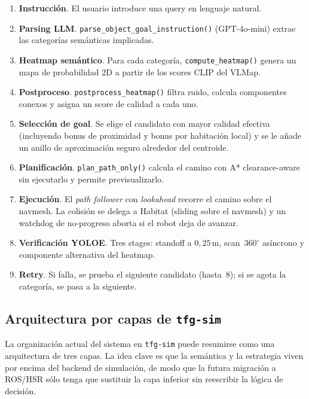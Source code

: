 \documentclass[11pt,a4paper]{article}
\begin{document}
\begin{enumerate}
  \item \textbf{Instrucción}. El usuario introduce una query en lenguaje
        natural.
  \item \textbf{Parsing LLM}. \texttt{parse\_object\_goal\_instruction()}
        (GPT-4o-mini) extrae las categorías semánticas implicadas.
  \item \textbf{Heatmap semántico}. Para cada categoría,
        \texttt{compute\_heatmap()} genera un mapa de probabilidad 2D a
        partir de los scores CLIP del VLMap.
  \item \textbf{Postproceso}. \texttt{postprocess\_heatmap()} filtra ruido,
        calcula componentes conexos y asigna un score de calidad a cada uno.
  \item \textbf{Selección de goal}. Se elige el candidato con mayor calidad
        efectiva (incluyendo bonus de proximidad y bonus por habitación
        local) y se le añade un anillo de aproximación seguro alrededor del
        centroide.
  \item \textbf{Planificación}. \texttt{plan\_path\_only()} calcula el camino
        con A* clearance-aware sin ejecutarlo y permite previsualizarlo.
  \item \textbf{Ejecución}. El \textit{path follower} con \textit{lookahead}
        recorre el camino sobre el navmesh. La colisión se delega a Habitat
        (sliding sobre el navmesh) y un watchdog de no-progreso aborta si el
        robot deja de avanzar.
  \item \textbf{Verificación YOLOE}. Tres stages: standoff a $0{,}25$\,m,
        scan~$360^\circ$ asíncrono y componente alternativa del heatmap.
  \item \textbf{Retry}. Si falla, se prueba el siguiente candidato (hasta~8);
        si se agota la categoría, se pasa a la siguiente.
\end{enumerate}

\subsection{Arquitectura por capas de \texttt{tfg-sim}}

La organización actual del sistema en \texttt{tfg-sim} puede resumirse como
una arquitectura de tres capas. La idea clave es que la semántica y la
estrategia viven por encima del backend de simulación, de modo que la futura
migración a ROS/HSR sólo tenga que sustituir la capa inferior sin reescribir la
lógica de decisión.
\end{document}
